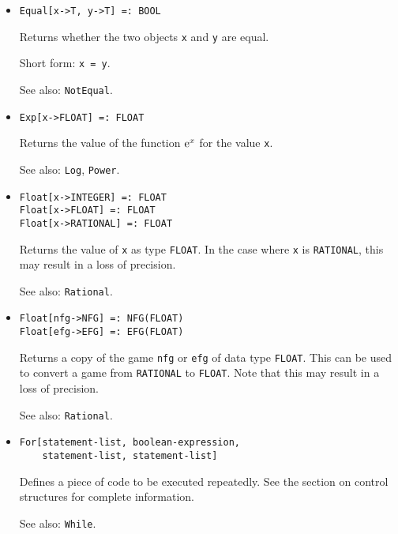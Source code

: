 \begin{itemize}
\item
\protect \large \begin{verbatim}
Equal[x->T, y->T] =: BOOL
\end{verbatim}\normalsize

\bd
Returns whether the two objects \verb+x+ and \verb+y+ are
equal.
\item
[Short form:] \verb+x = y+.
\item
[See also:] {\tt NotEqual}.
\ed

\item
\protect \large \begin{verbatim}
Exp[x->FLOAT] =: FLOAT
\end{verbatim} \normalsize

\bd
Returns the value of the function ${\rm e}^{x}$ for the
value \verb+x+.
\item
[See also:] {\tt Log}, {\tt Power}.
\ed



\item
\protect \large \begin{verbatim}
Float[x->INTEGER] =: FLOAT
Float[x->FLOAT] =: FLOAT
Float[x->RATIONAL] =: FLOAT
\end{verbatim} \normalsize

\bd
Returns the value of \verb+x+ as type {\tt FLOAT}.
In the case where \verb+x+ is {\tt RATIONAL}, this may result in a loss
of precision.
\item
[See also:] {\tt Rational}.
\ed

\item
\protect \large \begin{verbatim}
Float[nfg->NFG] =: NFG(FLOAT)
Float[efg->EFG] =: EFG(FLOAT)
\end{verbatim} \normalsize

\bd
Returns a copy of the game \verb+nfg+ or \verb+efg+ of data type 
{\tt FLOAT}.  This can be used to convert a game from {\tt RATIONAL}
to {\tt FLOAT}.  Note that this may result in a loss of precision.  
\item
[See also:] {\tt Rational}.
\ed

\item
\protect \large \begin{verbatim}
For[statement-list, boolean-expression, 
    statement-list, statement-list]
\end{verbatim}\normalsize

\bd
Defines a piece of code to be executed repeatedly.  See the section
on control structures for complete information.
\item
[See also:] \verb+While+.
\ed


\end{itemize}
